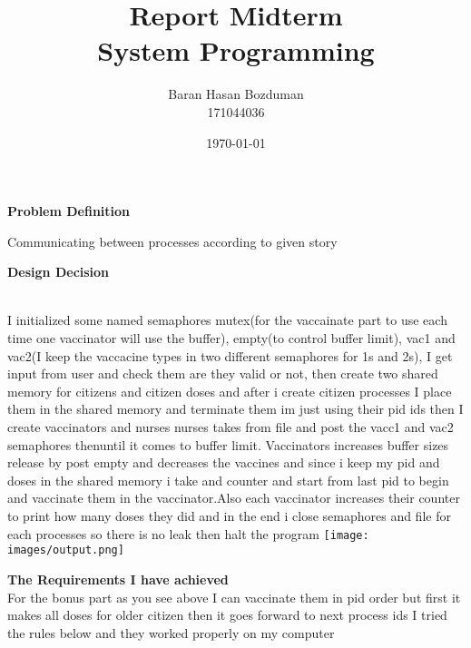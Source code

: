 \documentclass{report}
\title{\huge Report Midterm \\ \Huge System Programming}
\author{\huge Baran Hasan Bozduman\\ \huge 171044036}
\date{\today}
\begin{document}
\maketitle
{\huge \textbf{Problem Definition} \\}

{\large Communicating between processes according to given story \\}

{\huge \textbf{Design Decision} \\}



{\large  \\ I initialized some named semaphores mutex(for the vaccainate part to use each time one vaccinator will use the buffer), empty(to control buffer limit), vac1 and vac2(I keep the vaccacine types in two different semaphores for 1s and 2s), I get input from user and check them are they valid or not, then create two shared memory for citizens and citizen doses and after i create citizen processes I place them in the shared memory and terminate them im just using their pid ids then I create vaccinators and nurses nurses takes from file and post the vacc1 and vac2 semaphores thenuntil it comes to buffer limit. Vaccinators increases buffer sizes release by post empty and decreases the vaccines and since i keep my pid and doses in the shared memory i take and counter and start from last pid to begin and vaccinate them in the vaccinator.Also each vaccinator increases their counter to print how many doses they did and in the end i close semaphores and file for each processes so there is no leak then halt the program}
\newline
\texttt{[image: images/output.png]}

{\huge \textbf{The Requirements I have achieved} \\}
{\large For the bonus part as you see above I can vaccinate them in pid order but first it makes all doses for older citizen then it goes forward to next process ids }
 {\large I tried the rules below and they worked properly on my computer}
 
\end{document}
